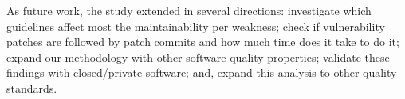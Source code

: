 \documentclass[smallextended]{svjour3}       %
\begin{document}
As future work, the study extended in several directions: 
investigate which guidelines affect most the maintainability per
weakness; check if vulnerability patches are followed by patch
commits and how much time does it take to do it; 
expand our methodology with other software quality properties; 
validate these findings with closed/private
software; and, expand this analysis to other quality standards.

%
%
\end{document}
